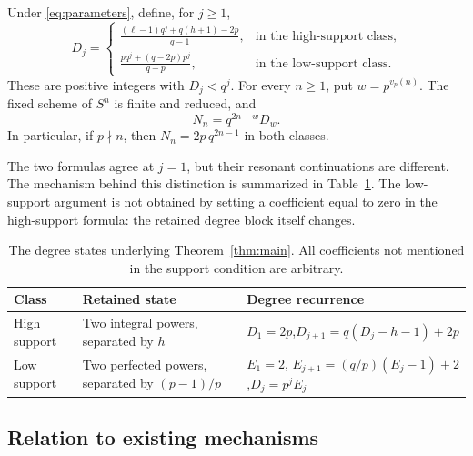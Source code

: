 \begin{theorem}\label{thm:main}
Under \eqref{eq:parameters}, define, for $j\ge1$,
\begin{equation}\label{eq:degree-formulas}
 D_j=
 \begin{cases}
 \displaystyle\frac{(\ell-1)q^j+q(h+1)-2p}{q-1},
       &\text{in the high-support class},\\[8pt]
 \displaystyle\frac{p q^j+(q-2p)p^j}{q-p},
       &\text{in the low-support class}.
 \end{cases}
\end{equation}
These are positive integers with $D_j<q^j$. For every $n\ge1$, put
$w=p^{v_p(n)}$. The fixed scheme of $S^n$ is finite and reduced, and
\begin{equation}\label{eq:main-count}
 \boxed{N_n=q^{2n-w}D_w.}
\end{equation}
In particular, if $p\nmid n$, then $N_n=2p\,q^{2n-1}$ in both classes.
\end{theorem}

The two formulas agree at $j=1$, but their resonant continuations
are different. The mechanism behind this distinction is summarized
in Table~\ref{tab:support}. The low-support argument is not obtained
by setting a coefficient equal to zero in the high-support formula:
the retained degree block itself changes.

\begin{table}[ht]
\centering
\caption{The degree states underlying Theorem~\ref{thm:main}. All
coefficients not mentioned in the support condition are arbitrary.}
\label{tab:support}
\small
\begin{tabular}{@{}p{}p{}p{}@{}}
\toprule
Class & Retained state & Degree recurrence \\
\midrule
High support & Two integral powers, separated by $h$ &
$D_1=2p$,\newline $D_{j+1}=q(D_j-h-1)+2p$ \\[4pt]
Low support & Two perfected powers, separated by $(p-1)/p$ &
$E_1=2$, $E_{j+1}=(q/p)(E_j-1)+2$,\newline $D_j=p^jE_j$ \\
\bottomrule
\end{tabular}
\end{table}

\subsection{Relation to existing mechanisms}

